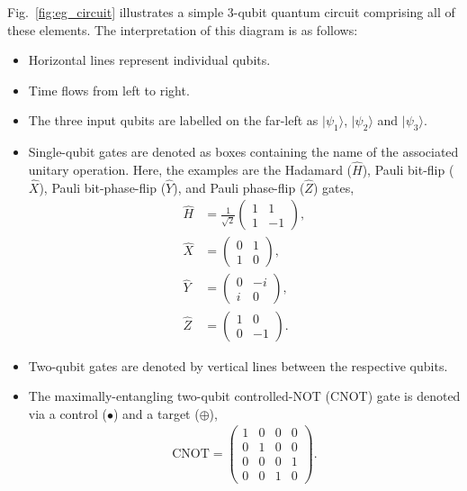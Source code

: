 \documentclass[aps,rmp,twocolumn,amsmath,amssymb,nofootinbib,superscriptaddress,longbibliography,floatfix,table-of-contents,eqsecnum]{revtex4-1}
\newcommand{\ket}[1]{|#1\rangle}
\begin{document}
Fig.~\ref{fig:eg_circuit} illustrates a simple 3-qubit quantum circuit comprising all of these elements. The interpretation of this diagram is as follows:
\begin{itemize}
	\item Horizontal lines represent individual qubits.
	\item Time flows from left to right.
	\item The three input qubits are labelled on the far-left as $\ket{\psi_1}$, $\ket{\psi_2}$ and $\ket{\psi_3}$.
	\item Single-qubit gates are denoted as boxes containing the name of the associated unitary operation. Here, the examples are the Hadamard ($\hat{H}$), Pauli bit-flip ($\hat{X}$), Pauli bit-phase-flip ($\hat{Y}$), and Pauli phase-flip ($\hat{Z}$) gates,
	\begin{align}
		\hat{H} &= \frac{1}{\sqrt{2}}\begin{pmatrix}
		1 & 1 \\
		1 & -1
		\end{pmatrix},\nonumber \\
		\hat{X} &= \begin{pmatrix}
		0 & 1 \\
		1 & 0
		\end{pmatrix},\nonumber \\
		\hat{Y} &= \begin{pmatrix}
		0 & -i \\
		i & 0
		\end{pmatrix},\nonumber \\
		\hat{Z} &= \begin{pmatrix}
		1 & 0 \\
		0 & -1
		\end{pmatrix}.
	\end{align}
	\item Two-qubit gates are denoted by vertical lines between the respective qubits.
	\item The maximally-entangling two-qubit controlled-NOT (CNOT) gate is denoted via a control ($\bullet$) and a target ($\oplus$),
	\begin{align}
		\hat{\text{CNOT}}=\begin{pmatrix}
		1 & 0 & 0 & 0 \\
		0 & 1 & 0 & 0 \\
		0 & 0 & 0 & 1 \\
		0 & 0 & 1 & 0
		\end{pmatrix}.

\end{align}
\end{itemize}
\end{document}
